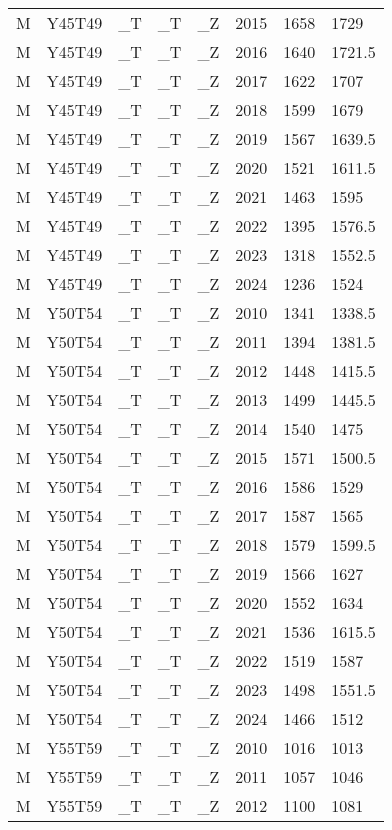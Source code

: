 \begin{longtable}[t]{llllllll}
\addlinespace
M & Y45T49 & \_T & \_T & \_Z & 2015 & 1658 & 1729\\
M & Y45T49 & \_T & \_T & \_Z & 2016 & 1640 & 1721.5\\
M & Y45T49 & \_T & \_T & \_Z & 2017 & 1622 & 1707\\
M & Y45T49 & \_T & \_T & \_Z & 2018 & 1599 & 1679\\
M & Y45T49 & \_T & \_T & \_Z & 2019 & 1567 & 1639.5\\
\addlinespace
M & Y45T49 & \_T & \_T & \_Z & 2020 & 1521 & 1611.5\\
M & Y45T49 & \_T & \_T & \_Z & 2021 & 1463 & 1595\\
M & Y45T49 & \_T & \_T & \_Z & 2022 & 1395 & 1576.5\\
M & Y45T49 & \_T & \_T & \_Z & 2023 & 1318 & 1552.5\\
M & Y45T49 & \_T & \_T & \_Z & 2024 & 1236 & 1524\\
\addlinespace
M & Y50T54 & \_T & \_T & \_Z & 2010 & 1341 & 1338.5\\
M & Y50T54 & \_T & \_T & \_Z & 2011 & 1394 & 1381.5\\
M & Y50T54 & \_T & \_T & \_Z & 2012 & 1448 & 1415.5\\
M & Y50T54 & \_T & \_T & \_Z & 2013 & 1499 & 1445.5\\
M & Y50T54 & \_T & \_T & \_Z & 2014 & 1540 & 1475\\
\addlinespace
M & Y50T54 & \_T & \_T & \_Z & 2015 & 1571 & 1500.5\\
M & Y50T54 & \_T & \_T & \_Z & 2016 & 1586 & 1529\\
M & Y50T54 & \_T & \_T & \_Z & 2017 & 1587 & 1565\\
M & Y50T54 & \_T & \_T & \_Z & 2018 & 1579 & 1599.5\\
M & Y50T54 & \_T & \_T & \_Z & 2019 & 1566 & 1627\\
\addlinespace
M & Y50T54 & \_T & \_T & \_Z & 2020 & 1552 & 1634\\
M & Y50T54 & \_T & \_T & \_Z & 2021 & 1536 & 1615.5\\
M & Y50T54 & \_T & \_T & \_Z & 2022 & 1519 & 1587\\
M & Y50T54 & \_T & \_T & \_Z & 2023 & 1498 & 1551.5\\
M & Y50T54 & \_T & \_T & \_Z & 2024 & 1466 & 1512\\
\addlinespace
M & Y55T59 & \_T & \_T & \_Z & 2010 & 1016 & 1013\\
M & Y55T59 & \_T & \_T & \_Z & 2011 & 1057 & 1046\\
M & Y55T59 & \_T & \_T & \_Z & 2012 & 1100 & 1081\\

\end{longtable}
